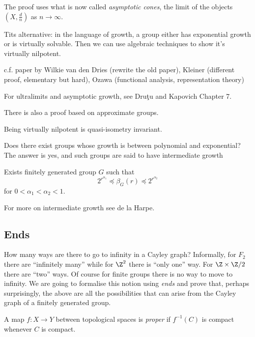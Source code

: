 \documentclass[a4paper]{article}
\begin{document}
\begin{remark}
  The proof uses what is now called \emph{asymptotic cones}, the limit of the objects \((X, \frac{d}{n})\) as \(n \to \infty\).

  Tits alternative: in the language of growth, a group either has exponential growth or is virtually solvable. Then we can use algebraic techniques to show it's virtually nilpotent.

  c.f. paper by Wilkie van den Dries (rewrite the old paper), Kleiner (different proof, elementary but hard), Ozawa (functional analysis, representation theory)

  For ultralimits and asymptotic growth, see Druţu and Kapovich Chapter 7.

  There is also a proof based on approximate groups.
\end{remark}

\begin{corollary}
  Being virtually nilpotent is quasi-isometry invariant.
\end{corollary}

Does there exist groups whose growth is between polynomial and exponential? The answer is yes, and such groups are said to have intermediate growth

\begin{theorem}[Grigorchuk, 1983]
  Exists finitely generated group \(G\) such that
  \[
    2^{r^{\alpha_1}} \preceq \beta_G(r) \preceq 2^{r^{\alpha_2}}
  \]
  for \(0 < \alpha_1 < \alpha_2 < 1\).
\end{theorem}

For more on intermediate growth see de la Harpe.

\subsection{Ends}

How many ways are there to go to infinity in a Cayley graph? Informally, for \(F_2\) there are ``infinitely many'' while for \(\Z^2\) there is ``only one'' way. For \(\Z \times \Z/2\) there are ``two'' ways. Of course for finite groups there is no way to move to infinity. We are going to formalise this notion using \emph{ends} and prove that, perhaps surprisingly, the above are all the possibilities that can arise from the Cayley graph of a finitely generated group.

\begin{definition}
  A map \(f: X \to Y\) between topological spaces is \emph{proper} if \(f^{-1}(C)\) is compact whenever \(C\) is compact.
\end{definition}
\end{document}
